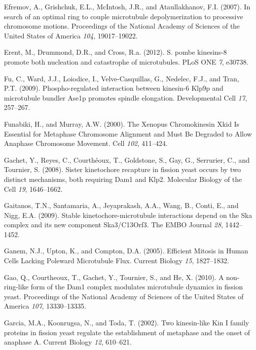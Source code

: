 \documentclass[12pt,a4paper,twoside,openright]{book}
\begin{document}
Efremov, A., Grishchuk, E.L., McIntosh, J.R., and Ataullakhanov, F.I.
(2007). In search of an optimal ring to couple microtubule
depolymerization to processive chromosome motions. Proceedings of the
National Academy of Sciences of the United States of America \emph{104},
19017--19022.

Erent, M., Drummond, D.R., and Cross, R.a. (2012). S. pombe kinesins-8
promote both nucleation and catastrophe of microtubules. PLoS ONE
\emph{7}, e30738.

Fu, C., Ward, J.J., Loiodice, I., Velve-Casquillas, G., Nedelec, F.J.,
and Tran, P.T. (2009). Phospho-regulated interaction between kinesin-6
Klp9p and microtubule bundler Ase1p promotes spindle elongation.
Developmental Cell \emph{17}, 257--267.

Funabiki, H., and Murray, A.W. (2000). The Xenopus Chromokinesin Xkid Is
Essential for Metaphase Chromosome Alignment and Must Be Degraded to
Allow Anaphase Chromosome Movement. Cell \emph{102}, 411--424.

Gachet, Y., Reyes, C., Courthéoux, T., Goldstone, S., Gay, G.,
Serrurier, C., and Tournier, S. (2008). Sister kinetochore recapture in
fission yeast occurs by two distinct mechanisms, both requiring Dam1 and
Klp2. Molecular Biology of the Cell \emph{19}, 1646--1662.

Gaitanos, T.N., Santamaria, A., Jeyaprakash, A.A., Wang, B., Conti, E.,
and Nigg, E.A. (2009). Stable kinetochore-microtubule interactions
depend on the Ska complex and its new component Ska3/C13Orf3. The EMBO
Journal \emph{28}, 1442--1452.

Ganem, N.J., Upton, K., and Compton, D.A. (2005). Efficient Mitosis in
Human Cells Lacking Poleward Microtubule Flux. Current Biology
\emph{15}, 1827--1832.

Gao, Q., Courtheoux, T., Gachet, Y., Tournier, S., and He, X. (2010). A
non-ring-like form of the Dam1 complex modulates microtubule dynamics in
fission yeast. Proceedings of the National Academy of Sciences of the
United States of America \emph{107}, 13330--13335.

Garcia, M.A., Koonrugsa, N., and Toda, T. (2002). Two kinesin-like Kin I
family proteins in fission yeast regulate the establishment of metaphase
and the onset of anaphase A. Current Biology \emph{12}, 610--621.
\end{document}
